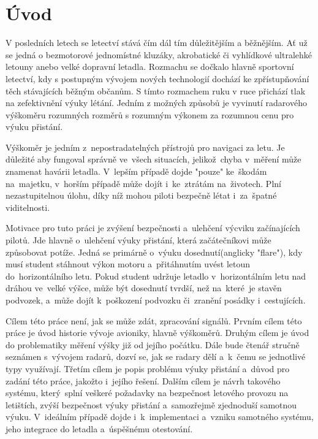
\newtheorem{definice}{Definice}

\chapter{Úvod}\label{uvod}
	V posledních letech se letectví stává čím dál tím důležitějším a běžnějším. Ať už se jedná o bezmotorové jednomístné kluzáky, akrobatické či vyhlídkové ultralehké letouny anebo velké dopravní letadla. Rozmachu se dočkalo hlavně sportovní letectví, kdy s postupným vývojem nových technologií dochází ke zpřístupňování těch stávajících běžným občanům. S tímto rozmachem ruku v ruce přichází tlak na zefektivnění výuky létání. Jedním z možných způsobů je vyvinutí radarového výškoměru rozumných rozměrů s rozumným výkonem za rozumnou cenu pro výuku přistání.

	Výškoměr je jedním z~nepostradatelných přístrojů pro navigaci za letu. Je důležité aby fungoval správně ve~všech situacích, jelikož~chyba v~měření může znamenat havárii letadla. V~lepším případě dojde "pouze" ke~škodám na~majetku, v~horším případě může dojít i~ke~ztrátám na~životech. Plní nezastupitelnou úlohu, díky níž mohou piloti bezpečně létat i~za~špatné viditelnosti.\par
	
	Motivace pro tuto práci je zvýšení bezpečnosti a~ulehčení výcviku začínajících pilotů. Jde hlavně o~ulehčení výuky přistání, která začátečníkovi může způsobovat potíže. Jedná se primárně o~výuku dosednutí(anglicky "flare"), kdy musí student stáhnout výkon motoru a~přitáhnutím uvést letoun do~horizontálního letu. Pokud student udržuje letadlo v~horizontálním letu nad dráhou ve~velké výšce, může být dosednutí tvrdší, než na~které~je stavěn podvozek, a~může dojít k~poškození podvozku či~zranění posádky i~cestujících.\par
		
	Cílem této práce není, jak se může zdát, zpracování signálů. Prvním cílem této práce je úvod historie vývoje avioniky, hlavně výškoměrů. Druhým cílem je úvod do problematiky měření výšky již od jejího počátku. Dále bude čtenář stručně seznámen s~vývojem radarů, dozví se, jak se radary dělí a~k~čemu se jednotlivé typy využívají.
	Třetím cílem je popis problému výuky přistání a~důvod pro zadání této práce, jakožto i~jejího řešení. Dalším cílem je návrh takového systému, který~splní veškeré požadavky na bezpečnost letového provozu na letištích, zvýší bezpečnost výuky přistání a~samozřejmě zjednoduší samotnou výuku. V~ideálním případě dojde i~k~implementaci a~vzniku samotného systému, jeho integrace do letadla a~úspěšnému otestování.\par

